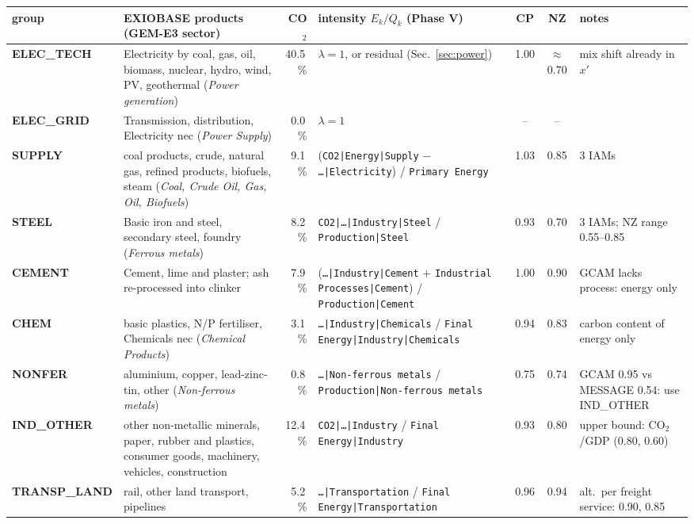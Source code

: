 \documentclass[11pt,a4paper]{article}
\newcommand{\var}[1]{\texttt{#1}}
\begin{document}
\begin{table}[h]
\centering\scriptsize
\renewcommand{\arraystretch}{1.25}
\begin{tabularx}{\textwidth}{@{}>{\bfseries}p{1.7cm} L r p{4.3cm} cc p{2.6cm}@{}}
\toprule
group & EXIOBASE products (GEM-E3 sector) & CO$_2$ & intensity $E_k/Q_k$ (Phase V) & CP & NZ & notes\\
\midrule
ELEC\_TECH & Electricity by coal, gas, oil, biomass, nuclear, hydro, wind, PV, geothermal (\emph{Power generation}) & 40.5\,\% & $\lambda=1$, or residual (Sec.~\ref{sec:power}) & 1.00 & $\approx$0.70 & mix shift already in $x'$\\
ELEC\_GRID & Transmission, distribution, Electricity nec (\emph{Power Supply}) & 0.0\,\% & $\lambda = 1$ & -- & -- & \\
SUPPLY & coal products, crude, natural gas, refined products, biofuels, steam (\emph{Coal, Crude Oil, Gas, Oil, Biofuels}) & 9.1\,\% & (\var{CO2|Energy|Supply} $-$ \var{\dots|Electricity}) / \var{Primary Energy} & 1.03 & 0.85 & 3 IAMs\\
STEEL & Basic iron and steel, secondary steel, foundry (\emph{Ferrous metals}) & 8.2\,\% & \var{CO2|\dots|Industry|Steel} / \var{Production|Steel} & 0.93 & 0.70 & 3 IAMs; NZ range 0.55--0.85\\
CEMENT & Cement, lime and plaster; ash re-processed into clinker & 7.9\,\% & (\var{\dots|Industry|Cement} $+$ \var{Industrial Processes|Cement}) / \var{Production|Cement} & 1.00 & 0.90 & GCAM lacks process: energy only\\
CHEM & basic plastics, N/P fertiliser, Chemicals nec (\emph{Chemical Products}) & 3.1\,\% & \var{\dots|Industry|Chemicals} / \var{Final Energy|Industry|Chemicals} & 0.94 & 0.83 & carbon content of energy only\\
NONFER & aluminium, copper, lead-zinc-tin, other (\emph{Non-ferrous metals}) & 0.8\,\% & \var{\dots|Non-ferrous metals} / \var{Production|Non-ferrous metals} & 0.75 & 0.74 & GCAM 0.95 vs MESSAGE 0.54: use IND\_OTHER\\
IND\_OTHER & other non-metallic minerals, paper, rubber and plastics, consumer goods, machinery, vehicles, construction & 12.4\,\% & \var{CO2|\dots|Industry} / \var{Final Energy|Industry} & 0.93 & 0.80 & upper bound: CO$_2$/GDP (0.80, 0.60)\\
TRANSP\_LAND & rail, other land transport, pipelines & 5.2\,\% & \var{\dots|Transportation} / \var{Final Energy|Transportation} & 0.96 & 0.94 & alt.\ per freight service: 0.90, 0.85\\

\end{tabularx}
\end{table}
\end{document}
